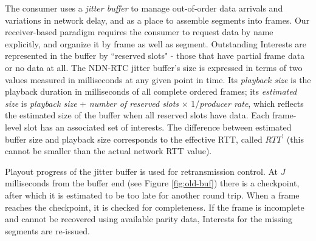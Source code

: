 \documentclass{icn/sig-alternate-2013} %
\newcommand{\ndnrtcName}{NDN-RTC} %
\begin{document}
The consumer uses a \textit{jitter buffer} to manage out-of-order data arrivals and variations in network delay, and as a place to assemble segments into frames. %
Our receiver-based paradigm requires the consumer to request data by name explicitly, and organize it by frame as well as segment. %
Outstanding Interests are represented in the buffer by ``reserved slots" - those that have partial frame data or no data at all.
The \ndnrtcName{} jitter buffer's size is expressed in terms of two values measured in milliseconds at any given point in time. Its \textit{playback size} is the playback duration in milliseconds of all complete ordered frames; its \textit{estimated size} is \textit{playback size} + \textit{number of reserved slots} $\times$ 1/\textit{producer rate}, which reflects the estimated size of the buffer when all reserved slots have data. Each frame-level slot has an associated set of interests. 
The difference between estimated buffer size and playback size corresponds to the effective RTT, called $RTT^{\prime}$ (this cannot be smaller than the actual network RTT value). %

Playout progress of the jitter buffer is used for retransmission control. %
At $J$ milliseconds from the buffer end (see Figure \ref{fig:old-buf}) there is a checkpoint, after which it is estimated to be too late for another round trip. When a frame reaches the checkpoint, it is checked for completeness. If the frame is incomplete and cannot be recovered using available parity data, Interests for the missing segments are re-issued. 
\end{document}
